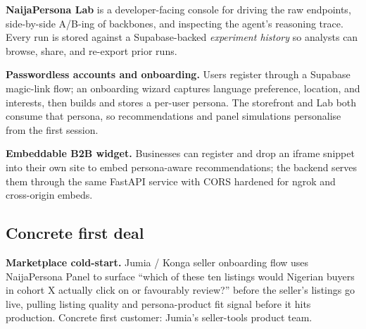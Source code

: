 \documentclass[sigconf,nonacm,balance]{acmart}
\begin{document}
\textbf{NaijaPersona Lab} is a developer-facing console for driving the raw
endpoints, side-by-side A/B-ing of backbones, and inspecting the agent's
reasoning trace. Every run is stored against a Supabase-backed
\emph{experiment history} so analysts can browse, share, and re-export
prior runs.

\textbf{Passwordless accounts and onboarding.} Users register through a
Supabase magic-link flow; an onboarding wizard captures language preference,
location, and interests, then builds and stores a per-user persona. The
storefront and Lab both consume that persona, so recommendations and panel
simulations personalise from the first session.

\textbf{Embeddable B2B widget.} Businesses can register and drop an iframe
snippet into their own site to embed persona-aware recommendations; the
backend serves them through the same FastAPI service with CORS hardened for
ngrok and cross-origin embeds.

\subsection*{Concrete first deal}
\textbf{Marketplace cold-start.} Jumia / Konga seller onboarding flow uses
NaijaPersona Panel to surface ``which of these ten listings would Nigerian
buyers in cohort X actually click on or favourably review?'' before the
seller's listings go live, pulling listing quality and persona-product fit
signal before it hits production. Concrete first customer: Jumia's
seller-tools product team.
\end{document}
